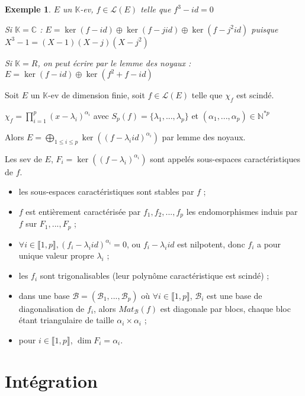 \documentclass[a4paper,12pt]{book}
\newcommand{\Def}[2]{\begin{tcolorbox}[sharp corners, colback=white,colframe=blue!90!black!75, title=Définition : #1]#2\end{tcolorbox}}
\newtheorem{Exe}{Exemple}[section]
\def\C{\mathbb{C}}
\def\N{\mathbb{N}}
\def\K{\mathbb{K}}
\begin{document}
\begin{Exe}
$E$ un $\K$-ev, $f\in\mathcal{L}(E)$ telle que $f^3-id=0$ \par Si $\K=\C$ : $E =\ker(f-id)\oplus\ker(f-jid)\oplus\ker(f-j^2id)$ puisque $X^3-1=(X-1)(X-j)(X-j^2)$ \par Si $\K=R$, on peut écrire par le lemme des noyaux : $E=\ker(f-id)\oplus\ker(f^2+f-id)$
\end{Exe}
\Def{Espaces caractéristiques}{Soit $E$ un $\K$-ev de dimension finie, soit $f\in\mathcal{L}(E)$ telle que $\chi_f$ est scindé. \par $\chi_f = \prod\limits_{i=1}^p(x-\lambda_i)^{\alpha_i}$ avec $S_p(f)=\{\lambda_1,...,\lambda_p\}$ et $(\alpha_1,...,\alpha_p)\in\N^{*p}$ \par Alors $E=\bigoplus\limits_{1\leq i\leq p}\ker((f-\lambda_iid)^{\alpha_i})$ par lemme des noyaux.
\par Les sev de $E$, $F_i = \ker((f-\lambda_i)^{\alpha_i})$ sont appelés sous-espaces caractéristiques de $f$.\begin{itemize}
\item les sous-espaces caractéristiques sont stables par $f$ ;
\item $f$ est entièrement caractérisée par $f_1,f_2,...,f_p$ les endomorphismes induis par $f$ sur $F_1,...,F_p$ ;
\item $\forall i\in\llbracket 1,p\rrbracket, (f_i-\lambda_iid)^{\alpha_i}=0$, ou $f_i-\lambda_iid$ est nilpotent, donc $f_i$ a pour unique valeur propre $\lambda_i$ ;
\item les $f_i$ sont trigonalisables (leur polynôme caractéristique est scindé) ;
\item dans une base $\mathcal{B}=(\mathcal{B}_1,...,\mathcal{B}_p)$ où $\forall i\in\llbracket 1,p\rrbracket$, $\mathcal{B}_i$ est une base de diagonalisation de $f_i$, alors $Mat_\mathcal{B}(f)$ est diagonale par blocs, chaque bloc étant triangulaire de taille $\alpha_i\times \alpha_i$ ;
\item pour $i\in\llbracket 1,p\rrbracket$, $\dim F_i = \alpha_i$.
\end{itemize}}



\chapter{Intégration}
\end{document}
